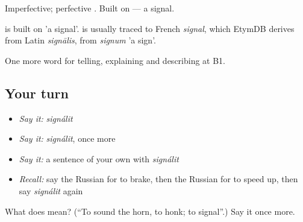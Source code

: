 Imperfective; perfective \emph{}. Built on \emph{} — a signal.

\begin{cousinweb}
\emph{} is built on \emph{} 'a signal'. \emph{} is usually traced to French \emph{signal}, which EtymDB derives from Latin \emph{signālis}, from \emph{signum} 'a sign'.
\end{cousinweb}

\begin{grammarlens}[title={What you've built}]
One more word for telling, explaining and describing at B1.
\end{grammarlens}

\subsection*{Your turn}
\begin{itemize}
\raggedright
  \item \emph{Say it:} \emph{signálit}
  \item \emph{Say it:} \emph{signálit}, once more
  \item \emph{Say it:} a sentence of your own with \emph{signálit}
  \item \emph{Recall:} say the Russian for to brake, then the Russian for to speed up, then say \emph{signálit} again
\end{itemize}

\begin{tcolorbox}[breakable,colback=teal!4,colframe=teal!35!black,title={Before you move on}]
What does  mean? (\textquotedblleft{}To sound the horn, to honk; to signal\textquotedblright{}.) Say it once more.
\end{tcolorbox}
